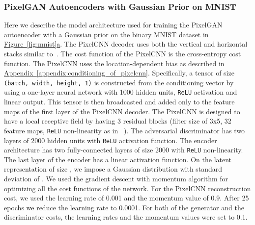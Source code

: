\documentclass{article}
\newcommand{\myfigg}[2]{\hyperref[fig:#1]{Figure~\ref*{fig:#1}#2}}
\newcommand{\myappendix}[1]{\hyperref[appendix:#1]{Appendix~\ref*{appendix:#1}}}
\begin{document}
\begin{appendices}
\subsubsection{PixelGAN Autoencoders with Gaussian Prior on MNIST}\label{appendix:gaussian-mnist}
Here we describe the model architecture used for training the PixelGAN autoencoder with a Gaussian prior on the binary MNIST dataset in \myfigg{mnist}{a}.
The PixelCNN decoder uses both the vertical and horizontal stacks similar to~\citep{pixelcnn}. The cost function of the PixelCNN is the cross-entropy cost function. 
The PixelCNN uses the location-dependent bias as described in \myappendix{conditioning_of_pixelcnn}. Specifically, a tensor of size \texttt{(batch, width, height, 1)} is constructed from the conditioning vector by using a one-layer neural network with 1000 hidden units, \texttt{ReLU} activation and linear output. This tensor is then broadcasted and added only to the feature maps of the first layer of the PixelCNN decoder. 
The PixelCNN is designed to have a local receptive field by having 3 residual blocks (filter size of 3x5, 32 feature maps, \texttt{ReLU} non-linearity as in ~\citep{pixelcnn}). The adversarial discriminator has two layers of 2000 hidden units with \texttt{ReLU} activation function. 
The encoder architecture has two fully-connected layers of size 2000 with \texttt{ReLU} non-linearity. 
The last layer of the encoder  has a linear activation function. On the latent representation of size , we impose a Gaussian distribution with standard deviation of . 
We used the gradient descent with momentum algorithm for optimizing all the cost functions of the network. 
For the PixelCNN reconstruction cost, we used the learning rate of 0.001 and the momentum value of 0.9. After 25 epochs we reduce the learning rate to 0.0001. For both of the generator and the discriminator costs, the learning rates and the momentum values were set to 0.1.


\end{appendices}
\end{document}
